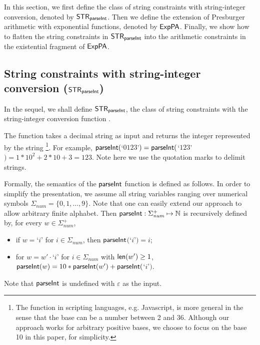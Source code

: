 
In this section, we first define the class of string constraints with string-integer conversion, denoted by ${\sf STR}_{\textsf{parseInt}}$. Then we define the extension of Presburger arithmetic with exponential functions, denoted by ${\sf ExpPA}$. Finally, we show how to flatten the string constraints in ${\sf STR}_{\textsf{parseInt}}$ into the arithmetic constraints in the existential fragment of ${\sf ExpPA}$. 

\subsection{String constraints with string-integer conversion (${\sf STR}_{\textsf{parseInt}}$)}

In the sequel, we shall define ${\sf STR}_{\textsf{parseInt}}$, the class of string constraints with the string-integer conversion function {\parseInt}.

The function {\parseInt} takes a decimal string as input and returns the integer represented by the string
\footnote{The {\parseInt} function in scripting languages, e.g. Javascript, is more general in the sense that the base can be a number between 2 and 36. Although our approach works for arbitrary positive bases, we choose to focus on the base 10 in this paper, for simplicity.}.
For example, ${\textsf{parseInt}}($`$0123$'$) = {\textsf{parseInt}}($`$123$'$)=1*10^2+2*10+3 = 123$. 
Note here we use the quotation marks to delimit strings.

Formally, the semantics of the $\textsf{parseInt}$ function is defined as follows. 
In order to simplify the presentation, we assume all string variables ranging over numerical symbols $\Sigma_{\textit{num}}=\{0,1, \ldots, 9\}$. 
Note that one can easily extend our approach to allow arbitrary finite alphabet. Then ${\textsf{parseInt}}: \Sigma_{\textit{num}}^+ \mapsto \mathbb{N}$ is recursively defined by, for every $w\in \Sigma_{\textit{num}}^+$,
\begin{itemize}
    \item if $w=$`$i$' for $i \in \Sigma_{\textit{num}}$, then ${\textsf{parseInt}}$$($`$i$'$)=i$;
    \item for $w = w'\cdot$`$i$' for $i \in \Sigma_{\textit{num}}$ with $\textsf{len}(w') \ge 1$, 
        ${\textsf{parseInt}}(w) = 10*{\textsf{parseInt}}(w')+{\textsf{parseInt}}($`$i$'$)$.
\end{itemize} 
Note that $\textsf{parseInt}$ is undefined with $\varepsilon$ as the input.

